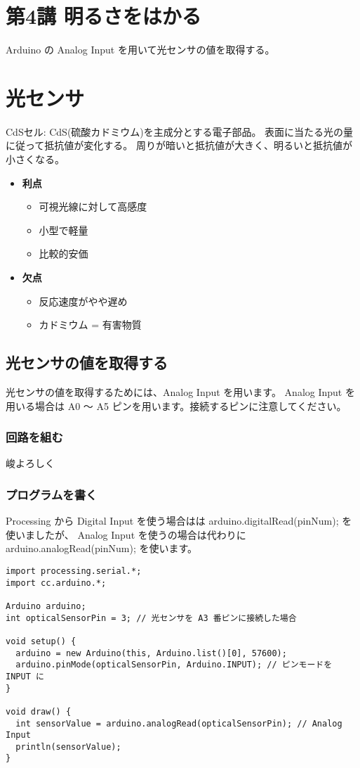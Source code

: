 \documentclass[11pt,a4paper]{jarticle}
\begin{document}
\section*{\LARGE{第4講 明るさをはかる}}
Arduino の Analog Input を用いて光センサの値を取得する。


\section{光センサ}
CdSセル: CdS(硫酸カドミウム)を主成分とする電子部品。
表面に当たる光の量に従って抵抗値が変化する。
周りが暗いと抵抗値が大きく、明るいと抵抗値が小さくなる。

\begin{itemize}
 \item \textbf{利点}
       \begin{itemize}
	\item 可視光線に対して高感度
	\item 小型で軽量
	\item 比較的安価
       \end{itemize}
 \item \textbf{欠点}
       \begin{itemize}
	\item 反応速度がやや遅め
	\item カドミウム = 有害物質
       \end{itemize}
\end{itemize}

\subsection*{光センサの値を取得する}
光センサの値を取得するためには、Analog Input を用います。
Analog Input を用いる場合は A0 〜 A5 ピンを用います。接続するピンに注意してください。

\subsubsection*{回路を組む}
峻よろしく

\subsubsection*{プログラムを書く}
Processing から Digital Input を使う場合はは arduino.digitalRead(pinNum); を使いましたが、
Analog Input を使うの場合は代わりに arduino.analogRead(pinNum); を使います。
\begin{lstlisting}
import processing.serial.*;
import cc.arduino.*;
 
Arduino arduino;
int opticalSensorPin = 3; // 光センサを A3 番ピンに接続した場合
 
void setup() {
  arduino = new Arduino(this, Arduino.list()[0], 57600);
  arduino.pinMode(opticalSensorPin, Arduino.INPUT); // ピンモードを INPUT に
}

void draw() {
  int sensorValue = arduino.analogRead(opticalSensorPin); // Analog Input
  println(sensorValue);
}
\end{lstlisting}
\end{document}
